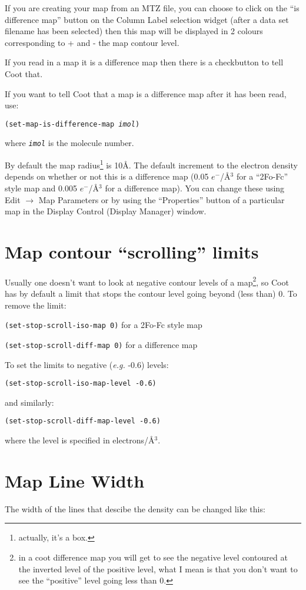 \documentclass{book}
\begin{document}
If you are creating your map from an MTZ file, you can choose to click
on the ``is difference map'' button on the Column
Label selection widget (after a data set filename has been selected)
then this map will be displayed in 2 colours corresponding to + and -
the map contour level.

If you read in a map it is a difference map then there is
a checkbutton to tell Coot that.

If you want to tell Coot that a map is a difference
map after it has been read, use:

\texttt{(set-map-is-difference-map \emph{imol})}

where \texttt{\emph{imol}} is the molecule number.

By default the map radius\footnote{actually, it's a box.} is 10\AA.
The default increment to the electron density depends on whether or
not this is a difference map (0.05 $e^-$/\AA$^3$ for a ``2Fo-Fc''
style map and 0.005 $e^-$/\AA$^3$ for a difference map).  You can
change these using \textsf{Edit $\rightarrow$ Map Parameters} or by
using the ``Properties'' button of a particular map in the Display
Control (Display Manager) window.

\section{Map contour ``scrolling'' limits}
Usually one doesn't want to look at negative contour levels of a map\footnote{in a coot
  difference map you will get to see the negative level contoured at
  the inverted level of the positive level, what I mean is that you
  don't want to see the ``positive'' level going less than 0.}, so
Coot has by default a limit that stops the contour level going beyond
(less than) 0.  To remove the limit:

\texttt{(set-stop-scroll-iso-map 0)} {for a 2Fo-Fc style map}

\texttt{(set-stop-scroll-diff-map 0)} {for a difference map}

To set the limits to negative (\emph{e.g.} -0.6) levels:

\texttt{(set-stop-scroll-iso-map-level -0.6)}

and similarly: 

\texttt{(set-stop-scroll-diff-map-level -0.6)}

where the level is specified in electrons/\AA$^3$.

\section{Map Line Width}
The width of the lines that descibe the density can
be changed like this:
\end{document}
